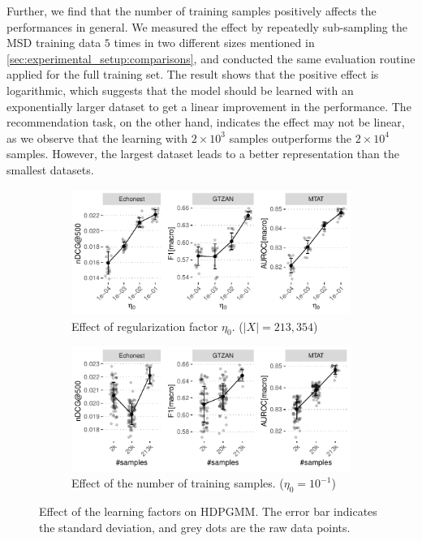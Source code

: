 \documentclass{article}
\begin{document}
Further, we find that the number of training samples positively affects the performances in general. We measured the effect by repeatedly sub-sampling the MSD training data $5$ times in two different sizes mentioned in \ref{sec:experimental_setup:comparisons}, and conducted the same evaluation routine applied for the full training set. The result shows that the positive effect is logarithmic, which suggests that the model should be learned with an exponentially larger dataset to get a linear improvement in the performance. The recommendation task, on the other hand, indicates the effect may not be linear, as we observe that the learning with $2\times10^{3}$ samples outperforms the $2\times10^{4}$ samples. However, the largest dataset leads to a better representation than the smallest datasets.
\begin{figure}[h]
    \begin{subfigure}{\linewidth}    
        \centering
        \includegraphics[width=\linewidth]{figs/regularization_effect.pdf}
        \caption{Effect of regularization factor $\eta_{0}$. ($|X| = 213,354$)}
        \label{fig:effects:regularization_effect}
    \end{subfigure}

    \begin{subfigure}{\linewidth}
        \centering
        \includegraphics[width=\linewidth]{figs/num_sample_effect.pdf}
        \caption{Effect of the number of training samples. ($\eta_{0} = 10^{-1}$)}
        \label{fig:effects:num_samples_effect}
    \end{subfigure}
    \caption{Effect of the learning factors on HDPGMM. The error bar indicates the standard deviation, and grey dots are the raw data points.}
    \vspace{-0.3cm}
    \label{fig:effects}
\end{figure}
\end{document}
